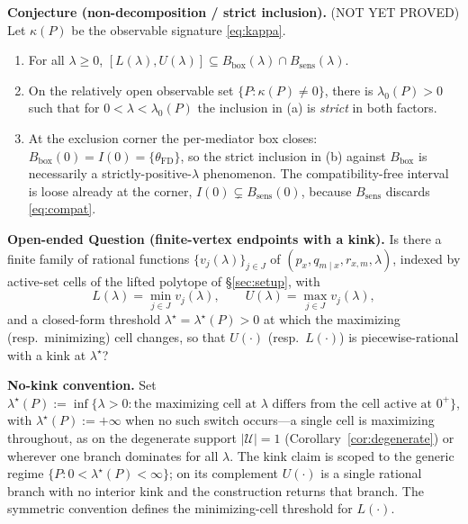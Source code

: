 \documentclass[11pt]{article}
\theoremstyle{definition}
\theoremstyle{plain}
\theoremstyle{remark}
\begin{document}
\label{conj:nondecomp}
\noindent\textbf{Conjecture  (non-decomposition / strict inclusion).}
\textnormal{(NOT YET PROVED)} Let $\kappa(P)$ be the observable signature \eqref{eq:kappa}.
\begin{enumerate}[label=(\alph*),leftmargin=2em,itemsep=1pt]
  \item For all $\lambda\ge0$, $[L(\lambda),U(\lambda)]\subseteq B_{\mathrm{box}}(\lambda)\cap B_{\mathrm{sens}}(\lambda)$.
  \item On the relatively open observable set $\{P:\kappa(P)\neq0\}$, there is $\lambda_0(P)>0$ such that
        for $0<\lambda<\lambda_0(P)$ the inclusion in (a) is \emph{strict} in both factors.
  \item At the exclusion corner the per-mediator box closes:
        $B_{\mathrm{box}}(0)=I(0)=\{\theta_{\mathrm{FD}}\}$, so the strict inclusion in (b) against
        $B_{\mathrm{box}}$ is necessarily a strictly-positive-$\lambda$ phenomenon. The compatibility-free
        interval is loose already at the corner, $I(0)\subsetneq B_{\mathrm{sens}}(0)$, because
        $B_{\mathrm{sens}}$ discards \eqref{eq:compat}.
\end{enumerate}

\label{oeq:vertex}
\noindent\textbf{Open-ended Question  (finite-vertex endpoints with a kink).}
Is there a finite family of rational functions $\{v_j(\lambda)\}_{j\in J}$ of $(p_x,q_{m\mid x},r_{x,m},\lambda)$,
indexed by active-set cells of the lifted polytope of \S\ref{sec:setup}, with
\[
  L(\lambda)=\min_{j\in J}v_j(\lambda),\qquad U(\lambda)=\max_{j\in J}v_j(\lambda),
\]
and a closed-form threshold $\lambda^\star=\lambda^\star(P)>0$ at which the maximizing (resp.\ minimizing)
cell changes, so that $U(\cdot)$ (resp.\ $L(\cdot)$) is piecewise-rational with a kink at $\lambda^\star$?

\smallskip\noindent\textbf{No-kink convention.} Set
$\lambda^\star(P):=\inf\{\lambda>0:\text{the maximizing cell at }\lambda\text{ differs from the cell active at }0^+\}$,
with $\lambda^\star(P):=+\infty$ when no such switch occurs---a single cell is maximizing throughout, as on the
degenerate support $|\mathcal U|=1$ (Corollary~\ref{cor:degenerate}) or wherever one branch dominates for all
$\lambda$. The kink claim is scoped to the generic regime $\{P:0<\lambda^\star(P)<\infty\}$; on its complement
$U(\cdot)$ is a single rational branch with no interior kink and the construction returns that branch. The
symmetric convention defines the minimizing-cell threshold for $L(\cdot)$.
\end{document}

